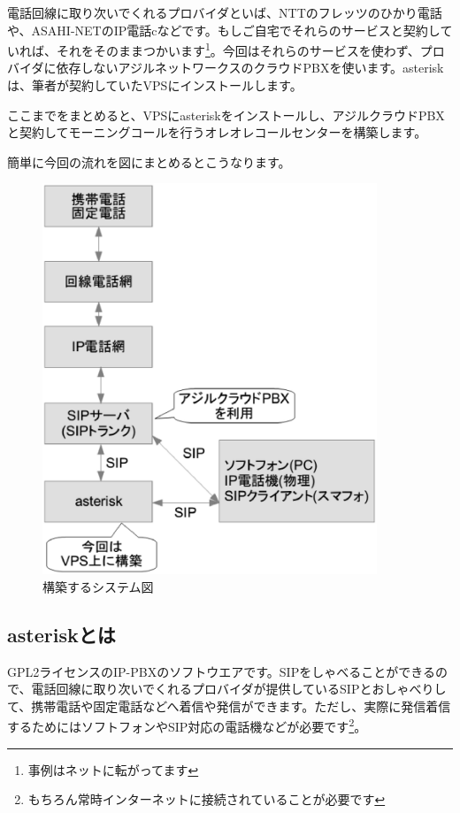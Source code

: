 電話回線に取り次いでくれるプロバイダといば、NTTのフレッツのひかり電話や、ASAHI-NETのIP電話cなどです。もしご自宅でそれらのサービスと契約していれば、それをそのままつかいます\footnote{事例はネットに転がってます}。今回はそれらのサービスを使わず、プロバイダに依存しないアジルネットワークスのクラウドPBXを使います。asteriskは、筆者が契約していたVPSにインストールします。

ここまでをまとめると、VPSにasteriskをインストールし、アジルクラウドPBXと契約してモーニングコールを行うオレオレコールセンターを構築します。

簡単に今回の流れを図にまとめるとこうなります。

\begin{figure}[htbp]
 \begin{center}
  \includegraphics[width=100mm]{tboffice-asterisk/img/gaiyou.eps}
 \end{center}
 \caption{構築するシステム図}
 \label{fig:gaiyou}
\end{figure}

\subsection{asteriskとは}
GPL2ライセンスのIP-PBXのソフトウエアです。SIPをしゃべることができるので、電話回線に取り次いでくれるプロバイダが提供しているSIPとおしゃべりして、携帯電話や固定電話などへ着信や発信ができます。ただし、実際に発信着信するためにはソフトフォンやSIP対応の電話機などが必要です\footnote{もちろん常時インターネットに接続されていることが必要です}。

